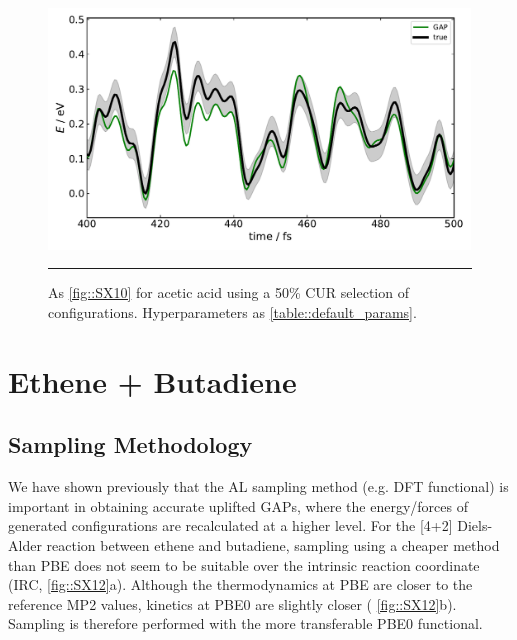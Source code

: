 \documentclass[11pt]{article}
\numberwithin{equation}{subsection}
\begin{document}
\begin{figure}[h!]
	\centering
	\vspace{0.4cm}
	\includegraphics[height=6.4cm]{figSX11.pdf}
	\vspace{0.1cm}
	\hrule
	\vspace{0.1cm}
	\caption{As \figurename{ \ref{fig::SX10}} for acetic acid using a 50\% CUR selection of configurations. Hyperparameters as \tablename{ \ref{table::default_params}}.}
	\label{fig::SX11}
\end{figure}





\clearpage
\section{Ethene + Butadiene}  \label{section::SI_ethene_butadiene}
\subsection{Sampling Methodology}

We have shown previously that the AL sampling method (e.g. DFT functional) is important in obtaining accurate uplifted GAPs,\supercite{gaptrain2021} where the energy/forces of generated configurations are recalculated at a higher level. For the [4+2] Diels-Alder reaction between ethene and butadiene, sampling using a cheaper method than PBE does not seem to be suitable over the intrinsic reaction coordinate (IRC, \figurename{ \ref{fig::SX12}}a). Although the thermodynamics at PBE are closer to the reference MP2 values, kinetics at PBE0 are slightly closer (\figurename{ \ref{fig::SX12}}b). Sampling is therefore performed with the more transferable PBE0 functional.
\end{document}
